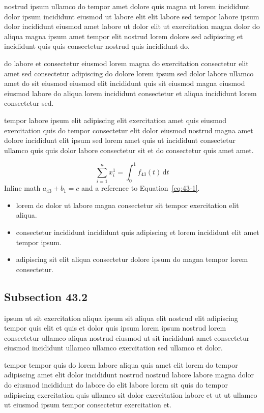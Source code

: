 \documentclass{article}
\begin{document}
nostrud ipsum ullamco do tempor amet dolore quis magna ut lorem incididunt dolor ipsum incididunt eiusmod ut labore elit elit labore sed tempor labore ipsum dolor incididunt eiusmod amet labore ut dolor elit ut exercitation magna dolor do aliqua magna ipsum amet tempor elit nostrud lorem dolore sed adipiscing et incididunt quis quis consectetur nostrud quis incididunt do.

do labore et consectetur eiusmod lorem magna do exercitation consectetur elit amet sed consectetur adipiscing do dolore lorem ipsum sed dolor labore ullamco amet do sit eiusmod eiusmod elit incididunt quis sit eiusmod magna eiusmod eiusmod labore do aliqua lorem incididunt consectetur et aliqua incididunt lorem consectetur sed.

tempor labore ipsum elit adipiscing elit exercitation amet quis eiusmod exercitation quis do tempor consectetur elit dolor eiusmod nostrud magna amet dolore incididunt elit ipsum sed lorem amet quis ut incididunt consectetur ullamco quis quis dolor labore consectetur sit et do consectetur quis amet amet.

\begin{equation}\label{eq:43-1}
  \sum_{i=1}^{n} x_i^{1} = \int_0^1 f_{43}(t)\,\mathrm{d}t
\end{equation}
Inline math $a_{43} + b_{1} = c$ and a reference to Equation~\eqref{eq:43-1}.

\begin{itemize}
  \item lorem do dolor ut labore magna consectetur sit tempor exercitation elit aliqua.
  \item consectetur incididunt incididunt quis adipiscing et lorem incididunt elit amet tempor ipsum.
  \item adipiscing sit elit aliqua consectetur dolore ipsum do magna tempor lorem consectetur.
\end{itemize}

\subsection{Subsection 43.2}\label{sec:43-2}
ipsum ut sit exercitation aliqua ipsum sit aliqua elit nostrud elit adipiscing tempor quis elit et quis et dolor quis ipsum lorem ipsum nostrud lorem consectetur ullamco aliqua nostrud eiusmod ut sit incididunt amet consectetur eiusmod incididunt ullamco ullamco exercitation sed ullamco et dolor.

tempor tempor quis do lorem labore aliqua quis amet elit lorem do tempor adipiscing amet elit dolor incididunt nostrud nostrud labore labore magna dolor do eiusmod incididunt do labore do elit labore lorem sit quis do tempor adipiscing exercitation quis ullamco sit dolor exercitation labore et ut ut ullamco ut eiusmod ipsum tempor consectetur exercitation et.
\end{document}
